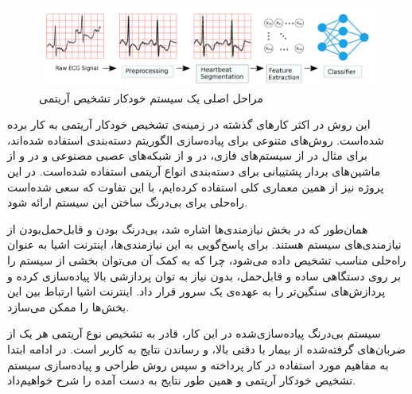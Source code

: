 \begin{figure}[!htb]
\centering
\includegraphics[width=15cm]{Figures/classifier.png}
\caption{مراحل اصلی یک سیستم خودکار تشخیص آریتمی\cite{Mondejar}}
\label{fig:classifierPicture}
\end{figure}
این روش در اکثر کارهای گذشته در زمینه‌ی تشخیص خودکار آریتمی به کار برده شده‌است. روش‌های متنوعی برای پیاده‌سازی الگوریتم دسته‌بندی استفاده شده‌اند، برای مثال در \cite{Exarchos2007} از سیستم‌های فازی، در \cite{deChazal2004} و \cite{Llamedo2011} از شبکه‌‌های عصبی مصنوعی و در \cite{Zhang2005} و \cite{Bazi2013} از ماشین‌های بردار پشتیبانی برای دسته‌بندی انواع آریتمی استفاده شده‌است. در این پروژه نیز از همین معماری کلی استفاده کرده‌ایم، با این تفاوت که سعی شده‌است راه‌حلی برای بی‌درنگ ساختن این سیستم ارائه شود. 

همان‌طور که در بخش نیازمندی‌ها اشاره شد، بی‌درنگ بودن و قابل‌حمل‌بودن از نیازمندی‌های سیستم هستند. برای پاسخ‌گویی به این نیازمندی‌ها، اینترنت اشیا به عنوان راه‌حلی مناسب تشخیص‌ داده می‌شود، چرا که به کمک آن می‌توان بخشی از سیستم را بر روی دستگاهی ساده و قابل‌حمل، بدون نیاز به توان پردازشی بالا پیاده‌سازی کرده و پردازش‌های سنگین‌تر را به عهده‌ی یک سرور قرار داد. اینترنت اشیا ارتباط بین این بخش‌ها را ممکن می‌سازد.

سیستم بی‌درنگ پیاده‌سازی‌شده در این کار،  قادر به تشخیص نوع آریتمی هر یک از ضربان‌های گرفته‌شده از بیمار با دقتی بالا، و رساندن نتایج به کاربر است. در ادامه ابتدا به مفاهیم مورد استفاده در کار پرداخته و سپس روش طراحی و پیاده‌سازی سیستم تشخیص خودکار آریتمی و همین طور نتایج به دست آمده را شرح خواهیم‌داد. 


